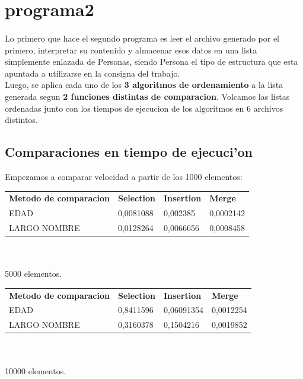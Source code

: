 \documentclass{article}
\begin{document}
	\section{programa2}
	\paragraph{}
	Lo primero que hace el segundo programa es leer el archivo generado por el primero, interpretar su contenido y almacenar esos datos en una lista simplemente enlazada de Personas, siendo Persona el tipo de estructura que esta apuntada a utilizarse en la consigna del trabajo.\\
	
	Luego, se aplica cada uno de los \textbf{3 algoritmos de ordenamiento} a la lista generada segun \textbf{2 funciones distintas de comparacion}. Volcamos las listas ordenadas junto con los tiempos de ejecucion de los algoritmos en 6 archivos distintos.\\
	
	\subsection{Comparaciones en tiempo de ejecuci'on}
	Empezamos a comparar velocidad a partir de los 1000 elementos:
	
	\begin{tabular}{llll}
		\textbf{Metodo de comparacion} & \textbf{Selection} & \textbf{Insertion} & \textbf{Merge} \\
		EDAD & 0,0081088 & 0,002385 & 0,0002142 \\
		LARGO NOMBRE & 0,0128264 & 0,0066656 & 0,0008458 \\
	\end{tabular}\\\\

	5000 elementos.

	\begin{tabular}{llll}
		\textbf{Metodo de comparacion} & \textbf{Selection} & \textbf{Insertion} & \textbf{Merge} \\
		EDAD & 0,8411596 & 0,06091354 & 0,0012254 \\
		LARGO NOMBRE & 0,3160378 & 0,1504216 & 0,0019852 \\
	\end{tabular}\\\\
	
	10000 elementos.
	
\end{document}
